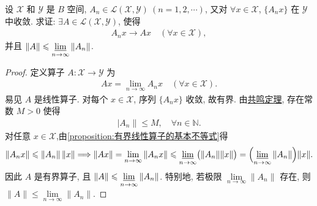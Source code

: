 \documentclass[../../main.tex]{subfiles}%
\begin{document}
\begin{example}
设 $\mathscr{X}$ 和 $\mathscr{Y}$ 是 $B$ 空间, $A_n\in\mathscr{L}(\mathscr{X},\mathscr{Y})\ (n=1,2,\cdots)$, 又对 $\forall x\in\mathscr{X}$, $\{A_nx\}$ 在 $\mathscr{Y}$ 中收敛. 求证: $\exists A\in\mathscr{L}(\mathscr{X},\mathscr{Y})$, 使得
\begin{align*}
A_nx\to Ax\quad (\forall x\in\mathscr{X}),
\end{align*}
并且 $\|A\|\leqslant \varliminf\limits_{n\to\infty}\|A_n\|$.
\end{example}
\begin{proof}
定义算子 $A:\mathscr{X}\to\mathscr{Y}$ 为
\begin{align*}
Ax=\lim\limits_{n\to\infty}A_nx\quad (\forall x\in\mathscr{X}).
\end{align*}
易见 $A$ 是线性算子. 对每个 $x\in\mathscr{X}$, 序列 $\{A_nx\}$ 收敛, 故有界. 由\hyperref[theorem:泛函分析--共鸣定理]{共鸣定理}, 存在常数 $M>0$ 使得 
\begin{align*}
|A_n\|\leqslant M,\quad \forall n\in \mathbb{N}.
\end{align*}
对任意 $x\in\mathscr{X}$,由\cref{proposition:有界线性算子的基本不等式}得
\begin{align*}
\left\| A_nx \right\| \leqslant \left\| A_n \right\| \left\| x \right\| \Longrightarrow \|Ax\| = \lim\limits_{n\to\infty}\|A_nx\|
\leqslant \varliminf\limits_{n\to\infty}\bigl(\|A_n\|\|x\|\bigr)
= \Bigl(\varliminf\limits_{n\to\infty}\|A_n\|\Bigr)\|x\|.
\end{align*}
因此 $A$ 是有界算子, 且 $\|A\|\leqslant \varliminf\limits_{n\to\infty}\|A_n\|$. 特别地, 若极限 $\lim\limits_{n\to\infty}\|A_n\|$ 存在, 则 $\|A\|\leqslant \lim\limits_{n\to\infty}\|A_n\|$.
\end{proof}
\end{document}
